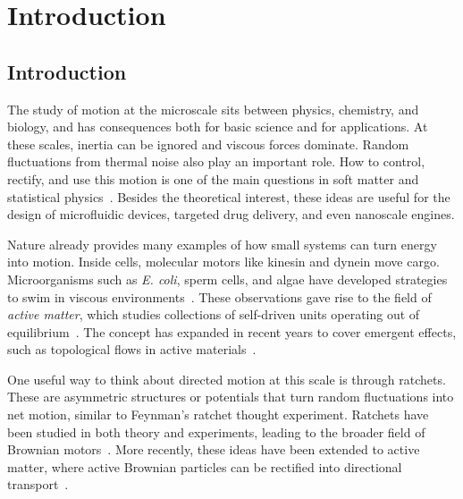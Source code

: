 \part{Introduction}
\label{part:introduction}

\chapter{Introduction}
\label{ch:introduction}

The study of motion at the microscale sits between physics, chemistry, and biology, and has consequences both for basic science and for applications. At these scales, inertia can be ignored and viscous forces dominate. Random fluctuations from thermal noise also play an important role. How to control, rectify, and use this motion is one of the main questions in soft matter and statistical physics~\cite{purcell2014life,einstein1906theory}. Besides the theoretical interest, these ideas are useful for the design of microfluidic devices, targeted drug delivery, and even nanoscale engines.

Nature already provides many examples of how small systems can turn energy into motion. Inside cells, molecular motors like kinesin and dynein move cargo. Microorganisms such as \textit{E. coli}, sperm cells, and algae have developed strategies to swim in viscous environments~\cite{howard2002mechanics, vale2003molecular, marchetti2013hydrodynamics}. These observations gave rise to the field of \textit{active matter}, which studies collections of self-driven units operating out of equilibrium~\cite{ramaswamy2010mechanics, needleman2017active, bechinger2016active}. The concept has expanded in recent years to cover emergent effects, such as topological flows in active materials~\cite{shankar2022topological}.

One useful way to think about directed motion at this scale is through ratchets. These are asymmetric structures or potentials that turn random fluctuations into net motion, similar to Feynman’s ratchet thought experiment. Ratchets have been studied in both theory and experiments, leading to the broader field of Brownian motors~\cite{julicher1997modeling, reimann2002brownian}. More recently, these ideas have been extended to active matter, where active Brownian particles can be rectified into directional transport~\cite{fiasconaro2008active, reichhardt2017ratchet, rein2023force}.

